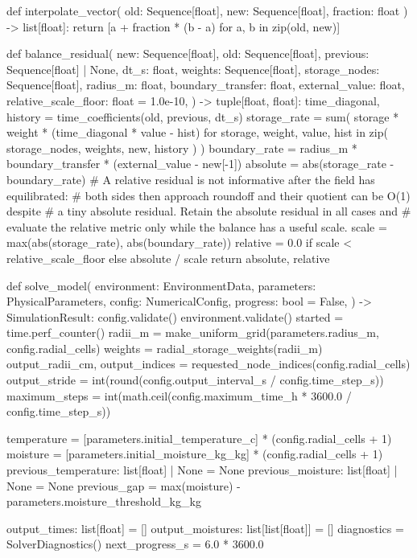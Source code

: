 \documentclass[withoutpreface,bwprint]{cumcmthesis}
\begin{document}
\begin{PythonCode}
def interpolate_vector(
    old: Sequence[float], new: Sequence[float], fraction: float
) -> list[float]:
    return [a + fraction * (b - a) for a, b in zip(old, new)]


def balance_residual(
    new: Sequence[float],
    old: Sequence[float],
    previous: Sequence[float] | None,
    dt_s: float,
    weights: Sequence[float],
    storage_nodes: Sequence[float],
    radius_m: float,
    boundary_transfer: float,
    external_value: float,
    relative_scale_floor: float = 1.0e-10,
) -> tuple[float, float]:
    time_diagonal, history = time_coefficients(old, previous, dt_s)
    storage_rate = sum(
        storage * weight * (time_diagonal * value - hist)
        for storage, weight, value, hist in zip(
            storage_nodes, weights, new, history
        )
    )
    boundary_rate = radius_m * boundary_transfer * (external_value - new[-1])
    absolute = abs(storage_rate - boundary_rate)
    # A relative residual is not informative after the field has equilibrated:
    # both sides then approach roundoff and their quotient can be O(1) despite
    # a tiny absolute residual.  Retain the absolute residual in all cases and
    # evaluate the relative metric only while the balance has a useful scale.
    scale = max(abs(storage_rate), abs(boundary_rate))
    relative = 0.0 if scale < relative_scale_floor else absolute / scale
    return absolute, relative


def solve_model(
    environment: EnvironmentData,
    parameters: PhysicalParameters,
    config: NumericalConfig,
    progress: bool = False,
) -> SimulationResult:
    config.validate()
    environment.validate()
    started = time.perf_counter()
    radii_m = make_uniform_grid(parameters.radius_m, config.radial_cells)
    weights = radial_storage_weights(radii_m)
    output_radii_cm, output_indices = requested_node_indices(config.radial_cells)
    output_stride = int(round(config.output_interval_s / config.time_step_s))
    maximum_steps = int(math.ceil(config.maximum_time_h * 3600.0 / config.time_step_s))

    temperature = [parameters.initial_temperature_c] * (config.radial_cells + 1)
    moisture = [parameters.initial_moisture_kg_kg] * (config.radial_cells + 1)
    previous_temperature: list[float] | None = None
    previous_moisture: list[float] | None = None
    previous_gap = max(moisture) - parameters.moisture_threshold_kg_kg

    output_times: list[float] = []
    output_moistures: list[list[float]] = []
    diagnostics = SolverDiagnostics()
    next_progress_s = 6.0 * 3600.0


\end{PythonCode}
\end{document}
